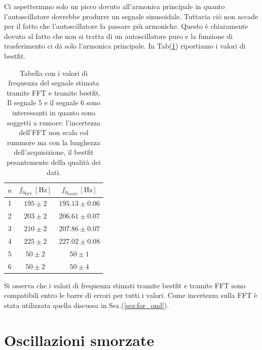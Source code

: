 \documentclass{article}
\begin{document}
    Ci aspettermmo solo un picco dovuto all'armonica principale in quanto
    l'autoscillatore dovrebbe produrre un segnale sinusoidale.
    Tuttavia ciò non accade per il fatto che l'autoscillatore fa passare più armoniche. 
    Questo è chiaramente dovuto al fatto che non si tratta di un autoscillatore puro e 
    la funzione di trasferimento ci dà solo l'armonica principale.
    In Tab(\ref{tab:cft_rfft_bestfit}) riportiamo i valori di bestfit.

        \begin{table}[H]
            \centering
            \begin{tabular}{c c c}
                \toprule
                $n$ & $f_{0_\text{FFT}} \, [\text{Hz}]$ & $f_{0_\text{bestfit}} \, [\text{Hz}]$ \\
                \midrule
                1 & $195 \pm 2$         & $195.13 \pm 0.06$ \\
                2 & $203 \pm 2$       & $206.61 \pm 0.07$ \\
                3 & $210 \pm 2$         & $207.86 \pm 0.07$ \\
                4 & $225 \pm 2$         & $227.02 \pm 0.08$ \\
                5 & $50 \pm 2$          & $50 \pm 1$ \\
                6 & $50 \pm 2$          & $50 \pm 4$ \\
                \bottomrule
            \end{tabular}
            \caption{Tabella con i valori di frequenza del segnale stimata tramite FFT 
            e tramite bestfit. Il segnale 5 e il segnale 6 sono interessanti
            in quanto sono soggetti a rumore: l'incertezza dell'FFT non scala col rummore ma con
            la lunghezza dell'acquisizione, il bestfit pesantemente della qualità dei dati.}
            \label{tab:cft_rfft_bestfit}
        \end{table}
    Si osserva che i valori di frequenza stimati tramite bestfit e tramite FFT 
    sono compatibili entro le barre di errori per tutti i valori. 
    Come incertezza sulla FFT è stata utilizzata quella discussa in Sez.(\ref{sez:for_ond}).

\section{Oscillazioni smorzate}
\end{document}
